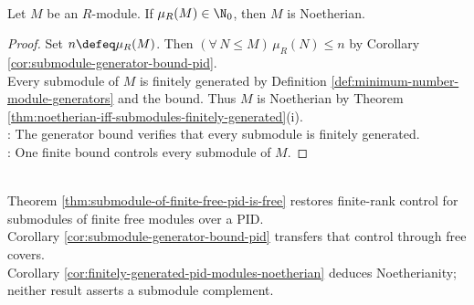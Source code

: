\begin{corollary} \label{cor:finitely-generated-pid-modules-noetherian} \\
Let $M$ be an $R$-module. If $\mu_R(M)\in\N_0$, then $M$ is Noetherian.
\begin{proof}
Set $n\defeq\mu_R(M)$. Then $(\forall\,N\leq M)\,\mu_R(N)\leq n$ by Corollary \ref{cor:submodule-generator-bound-pid}.\\
Every submodule of $M$ is finitely generated by Definition \ref{def:minimum-number-module-generators} and the bound. Thus $M$ is Noetherian by Theorem \ref{thm:noetherian-iff-submodules-finitely-generated}(i).\\
: The generator bound verifies that every submodule is finitely generated.\\
: One finite bound controls every submodule of $M$.
\end{proof}
\end{corollary}

\begin{perspective} \label{per:pid-noetherian-specialization} \\
Theorem \ref{thm:submodule-of-finite-free-pid-is-free} restores finite-rank control for submodules of finite free modules over a PID.\\
Corollary \ref{cor:submodule-generator-bound-pid} transfers that control through free covers.\\
Corollary \ref{cor:finitely-generated-pid-modules-noetherian} deduces Noetherianity; neither result asserts a submodule complement.
\end{perspective}

